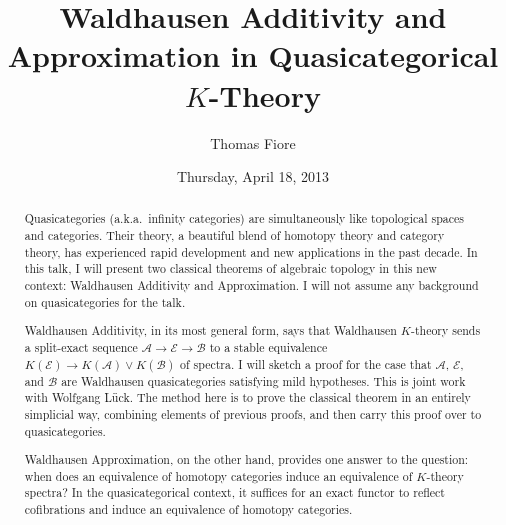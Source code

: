 \documentclass{UAmathtalk}
\author{Thomas Fiore}
\title{Waldhausen Additivity and Approximation in Quasicategorical $K$-Theory}
\date{Thursday, April 18, 2013}
\begin{document}
\maketitle

\begin{abstract}
Quasicategories (a.k.a.\ infinity categories) are simultaneously like topological spaces and categories.  Their theory, a beautiful blend of homotopy theory and category theory, has experienced rapid development and new applications in the past decade. In this talk, I will present two classical theorems of algebraic topology in this new context: Waldhausen Additivity and Approximation.  I will not assume any background on quasicategories for the talk. 

Waldhausen Additivity, in its most general form, says that Waldhausen $K$-theory sends a split-exact sequence $\mathcal{A} \rightarrow \mathcal{E} \rightarrow \mathcal{B}$ to a stable equivalence $K(\mathcal{E}) \rightarrow K(\mathcal{A}) \vee K(\mathcal{B})$ of spectra. I will sketch a proof for the case that $\mathcal{A}$, $\mathcal{E}$, and $\mathcal{B}$ are Waldhausen quasicategories satisfying mild hypotheses. This is joint work with Wolfgang L\"uck. The method here is to prove the classical theorem in an entirely simplicial way, combining elements of previous proofs, and then carry this proof over to quasicategories.

Waldhausen Approximation, on the other hand, provides one answer to the question: when does an equivalence of homotopy categories induce an equivalence of $K$-theory spectra?  In the quasicategorical context, it suffices for an exact functor to reflect cofibrations and induce an equivalence of homotopy categories. 
\end{abstract}
\end{document}
